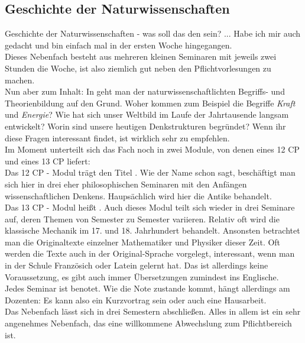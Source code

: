 \subsection{Geschichte der Naturwissenschaften}

Geschichte der Naturwissenschaften - was soll das den sein?
... Habe ich mir auch gedacht und bin einfach mal in der ersten Woche hingegangen.\\
Dieses Nebenfach besteht aus mehreren kleinen Seminaren mit jeweils zwei Stunden die Woche, ist also ziemlich gut neben den Pflichtvorlesungen zu machen.\\

Nun aber zum Inhalt:
In  geht man der naturwissenschaftlichten Begriffs- und Theorienbildung auf den Grund.
Woher kommen zum Beispiel die Begriffe \textit{Kraft} und \textit{Energie}?
Wie hat sich unser Weltbild im Laufe der Jahrtausende langsam entwickelt?
Worin sind unsere heutigen Denkstrukturen begründet?
Wenn ihr diese Fragen interessant findet, ist  wirklich sehr zu empfehlen.\\

Im Moment unterteilt sich das Fach noch in zwei Module, von denen eines 12 CP und eines 13 CP liefert:\\
Das 12 CP - Modul trägt den Titel .
Wie der Name schon sagt, beschäftigt man sich hier in drei eher philosophischen Seminaren mit den Anfängen wissenschaftlichen Denkens.
Haupsächlich wird hier die Antike behandelt.\\
Das 13 CP - Modul heißt .
Auch dieses Modul teilt sich wieder in drei Seminare auf, deren Themen von Semester zu Semester variieren.
Relativ oft wird die klassische Mechanik im 17. und 18. Jahrhundert behandelt.
Ansonsten betrachtet man die Originaltexte einzelner Mathematiker und Physiker dieser Zeit.
Oft werden die Texte auch in der Original-Sprache vorgelegt, interessant, wenn man in der Schule Französich oder Latein gelernt hat.
Das ist allerdings keine Voraussetzung, es gibt auch immer Übersetzungen zumindest ins Englische.\\

Jedes Seminar ist benotet.
Wie die Note zustande kommt, hängt allerdings am Dozenten:
Es kann also ein Kurzvortrag sein oder auch eine Hausarbeit.\\

Das Nebenfach lässt sich in drei Semestern abschließen.
Alles in allem ist  ein sehr angenehmes Nebenfach, das eine willkommene Abwechslung zum Pflichtbereich ist.

